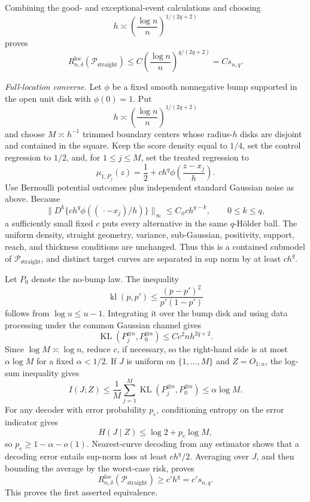 Combining the good- and exceptional-event calculations and choosing
\[
 h\asymp\left(\frac{\log n}{n}\right)^{1/(2q+2)}
\]
proves
\[
 R_{n,\delta}^{\mathrm{loc}}(\mathcal P_{\mathrm{straight}})
 \leq C\left(\frac{\log n}{n}\right)^{q/(2q+2)}=Cs_{n,q}.
\]

\emph{Full-location converse.}
Let \(\phi\) be a fixed smooth nonnegative bump supported in the open unit disk with \(\phi(0)=1\).  Put
\[
 h\asymp\left(\frac{\log n}{n}\right)^{1/(2q+2)}
\]
and choose \(M\asymp h^{-1}\) trimmed boundary centers whose radius-\(h\) disks are disjoint and contained in the square.  Keep the score density equal to \(1/4\), set the control regression to \(1/2\), and, for \(1\leq j\leq M\), set the treated regression to
\[
 \mu_{1,P_j}(z)=\frac12+c h^q\phi\!\left(\frac{z-x_j}{h}\right).
\]
Use Bernoulli potential outcomes plus independent standard Gaussian noise as above.  Because
\[
 \lVert D^k\{c h^q\phi((\,\cdot-x_j)/h)\}\rVert_\infty
 \leq C_\phi c h^{q-k},\qquad 0\leq k\leq q,
\]
a sufficiently small fixed \(c\) puts every alternative in the same \(q\)-H\"older ball.  The uniform density, straight geometry, variance, sub-Gaussian, positivity, support, reach, and thickness conditions are unchanged.  Thus this is a contained submodel of \(\mathcal P_{\mathrm{straight}}\), and distinct target curves are separated in sup norm by at least \(c h^q\).

Let \(P_0\) denote the no-bump law.  The inequality
\[
 \operatorname{kl}(p,p')\leq\frac{(p-p')^2}{p'(1-p')}
\]
follows from \(\log u\leq u-1\).  Integrating it over the bump disk and using data processing under the common Gaussian channel gives
\[
 \operatorname{KL}(P_j^{\otimes n},P_0^{\otimes n})
 \leq Cc^2nh^{2q+2}.
\]
Since \(\log M\asymp\log n\), reduce \(c\), if necessary, so the right-hand side is at most \(\alpha\log M\) for a fixed \(\alpha<1/2\).  If \(J\) is uniform on \(\{1,\ldots,M\}\) and \(Z=O_{1:n}\), the log-sum inequality gives
\[
 I(J;Z)\leq\frac1M\sum_{j=1}^M
 \operatorname{KL}(P_j^{\otimes n},P_0^{\otimes n})
 \leq\alpha\log M.
\]
For any decoder with error probability \(p_e\), conditioning entropy on the error indicator gives
\[
 H(J\mid Z)\leq\log2+p_e\log M,
\]
so \(p_e\geq1-\alpha-o(1)\).  Nearest-curve decoding from any estimator shows that a decoding error entails sup-norm loss at least \(c h^q/2\).  Averaging over \(J\), and then bounding the average by the worst-case risk, proves
\[
 R_{n,\delta}^{\mathrm{loc}}(\mathcal P_{\mathrm{straight}})
 \geq c' h^q=c's_{n,q}.
\]
This proves the first asserted equivalence.

